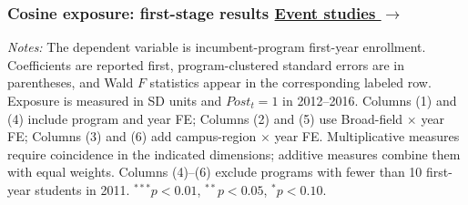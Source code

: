 \documentclass{beamer}
\begin{document}
\begin{frame}
\hypertarget{cosine-first-stage}{}
\frametitle{
    Cosine exposure: first-stage results
    \hfill
    \hyperlink{cosine-event-studies}{
        \scriptsize\color{blue}
        Event studies $\rightarrow$
    }
}

\begin{center}
\end{center}

\vspace{-0.14cm}

\begin{table}
\centering
\tiny

\setlength{\tabcolsep}{3.3pt}
\renewcommand{\arraystretch}{0.92}

\resizebox{0.8\textwidth}{!}{

}

\vspace{0.04cm}

\parbox{0.97\textwidth}{
\tiny
\textit{Notes:}
The dependent variable is incumbent-program first-year enrollment.
Coefficients are reported first, program-clustered standard errors are in
parentheses, and Wald $F$ statistics appear in the corresponding labeled
row. Exposure is measured in SD units and $Post_t=1$ in 2012--2016.
Columns (1) and (4) include program and year FE; Columns (2) and (5) use
Broad-field $\times$ year FE; Columns (3) and (6) add campus-region
$\times$ year FE. Multiplicative measures require coincidence in the
indicated dimensions; additive measures combine them with equal weights.
Columns (4)--(6) exclude programs with fewer than 10 first-year students
in 2011. $^{***}p<0.01$, $^{**}p<0.05$, $^{*}p<0.10$.
}

\end{table}

\end{frame}
\end{document}
